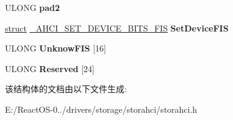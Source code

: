 \begin{DoxyCompactItemize}
U\+L\+O\+NG {\bfseries pad2}
\item 
\mbox{\label{struct___a_h_c_i___r_e_c_e_i_v_e_d___f_i_s_a24dd65547d9113a019bcb29297356886}} 
\hyperlink{interfacestruct}{struct} \hyperlink{struct___a_h_c_i___s_e_t___d_e_v_i_c_e___b_i_t_s___f_i_s}{\+\_\+\+A\+H\+C\+I\+\_\+\+S\+E\+T\+\_\+\+D\+E\+V\+I\+C\+E\+\_\+\+B\+I\+T\+S\+\_\+\+F\+IS} {\bfseries Set\+Device\+F\+IS}
\item 
\mbox{\label{struct___a_h_c_i___r_e_c_e_i_v_e_d___f_i_s_a2faf51223770b8e3d6e8fddde7700b22}} 
U\+L\+O\+NG {\bfseries Unknow\+F\+IS} \mbox{[}16\mbox{]}
\item 
\mbox{\label{struct___a_h_c_i___r_e_c_e_i_v_e_d___f_i_s_a7fe6c4da0067244877d04144e5706458}} 
U\+L\+O\+NG {\bfseries Reserved} \mbox{[}24\mbox{]}
\end{DoxyCompactItemize}


该结构体的文档由以下文件生成\+:\begin{DoxyCompactItemize}
\item 
E\+:/\+React\+O\+S-\/0../drivers/storage/storahci/storahci.\+h\end{DoxyCompactItemize}
